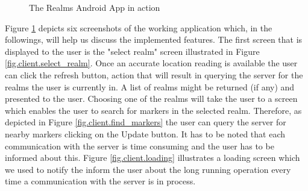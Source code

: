 \begin{figure}[H]
{                \label{fig.client.info_marker}
        }
        \caption{The Realms Android App in action}
        \label{fig.client}
\end{figure}
\noindent Figure \ref{fig.client} depicts six screenshots of the working application which, in the followings, will help us discuss the implemented features. The first screen that is displayed to the user is the "select realm" screen illustrated in Figure \ref{fig.client.select_realm}. Once an accurate location reading is available the user can click the refresh button, action that will result in querying the server for the realms the user is currently in. A list of realms might be returned (if any) and presented to the user. Choosing one of the realms will take the user to a screen which enables the user to search for markers in the selected realm. Therefore, as depicted in Figure \ref{fig.client.find_markers} the user can query the server for nearby markers clicking on the Update button. It has to be noted that each communication with the server is time consuming and the user has to be informed about this. Figure \ref{fig.client.loading} illustrates a loading screen which we used to notify the inform the user about the long running operation every time a communication with the server is in process.
\\

